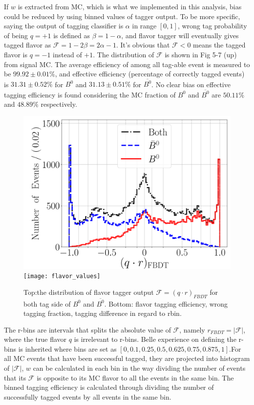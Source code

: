   If $w$ is extracted from MC, which is what we implemented in this analysis, bias could be reduced by using binned values of tagger output. To be more specific, saying the output of tagging classifier is $\alpha$ in range $[0,1]$, wrong tag probability of being $q= +1$ is defined as $ \beta = 1-\alpha$, and flavor tagger will eventually gives tagged flavor as $ \mathcal{F}= 1-2\beta = 2\alpha -1$. It's obvious that $\mathcal{F} < 0$ means the tagged flavor is $q=-1$ instead of $+1$. The distribution of $\mathcal{F}$ is shown in Fig 5-7 (up) from signal MC. The average efficiency of among all tag-able event is measured to be $99.92 \pm 0.01 \%$, and effective efficiency (percentage of correctly tagged events) is $31.31 \pm 0.52\%$ for $B^0$ and $31.13 \pm 0.51\%$ for $\overline{B^0}$. No clear bias on effective tagging efficiency is found considering the MC fraction of $B^0$ and $\overline{B^0}$ are $50.11\%$ and $48.89\%$ respectively.
 
 \begin{figure}[htpb]
 	\centering
 	\includegraphics[width=0.7\linewidth]{figures/qr}
 	\texttt{[image: flavor\_values]}
 	\caption{Top:the distribution of flavor tagger output $\mathcal{F}=(q\cdot r)_{FBDT}$ for both tag side of $B^0$ and $\overline{B^0}$. Bottom: flavor tagging efficiency, wrong tagging fraction, tagging difference in regard to rbin.}
 	\label{fig:qr}
 \end{figure}
 
 
 The r-bins are intervals that splits the absolute value of $\mathcal{F}$, namely $r_{FBDT}=|\mathcal{F}|$, where the true flavor $q$ is irrelevant to r-bins. Belle experience on defining the r-bins is inherited where bins are set as $[0,0.1,0.25,0.5,0.625,0.75,0.875,1]$.For all MC events that have been successful tagged, they are projected into histogram of $|\mathcal{F}|$, $w$ can be calculated in each bin in the way  dividing the number of events that its $\mathcal{F}$ is opposite to its MC flavor to all the events in the same bin. The binned tagging efficiency is calculated through dividing the number of successfully tagged events by all events in the same bin. 
 
